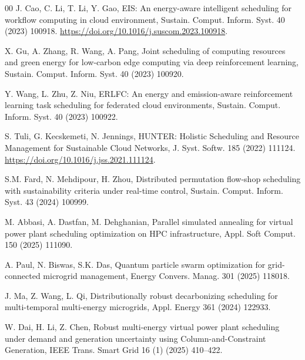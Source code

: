 \documentclass[a4paper,fleqn]{cas-dc}
\begin{document}
\begin{thebibliography}{00}
J. Cao, C. Li, T. Li, Y. Gao, EIS: An energy-aware intelligent scheduling for workflow computing in cloud environment, Sustain. Comput. Inform. Syst. 40 (2023) 100918. \url{https://doi.org/10.1016/j.suscom.2023.100918}.

X. Gu, A. Zhang, R. Wang, A. Pang, Joint scheduling of computing resources and green energy for low-carbon edge computing via deep reinforcement learning, Sustain. Comput. Inform. Syst. 40 (2023) 100920.

Y. Wang, L. Zhu, Z. Niu, ERLFC: An energy and emission-aware reinforcement learning task scheduling for federated cloud environments, Sustain. Comput. Inform. Syst. 40 (2023) 100922.

S. Tuli, G. Kecskemeti, N. Jennings, HUNTER: Holistic Scheduling and Resource Management for Sustainable Cloud Networks, J. Syst. Softw. 185 (2022) 111124. \url{https://doi.org/10.1016/j.jss.2021.111124}.

S.M. Fard, N. Mehdipour, H. Zhou, Distributed permutation flow-shop scheduling with sustainability criteria under real-time control, Sustain. Comput. Inform. Syst. 43 (2024) 100999.

M. Abbasi, A. Dastfan, M. Dehghanian, Parallel simulated annealing for virtual power plant scheduling optimization on HPC infrastructure, Appl. Soft Comput. 150 (2025) 111090.

A. Paul, N. Biswas, S.K. Das, Quantum particle swarm optimization for grid-connected microgrid management, Energy Convers. Manag. 301 (2025) 118018.

J. Ma, Z. Wang, L. Qi, Distributionally robust decarbonizing scheduling for multi-temporal multi-energy microgrids, Appl. Energy 361 (2024) 122933.

W. Dai, H. Li, Z. Chen, Robust multi-energy virtual power plant scheduling under demand and generation uncertainty using Column-and-Constraint Generation, IEEE Trans. Smart Grid 16 (1) (2025) 410--422.

\end{thebibliography}
\end{document}
